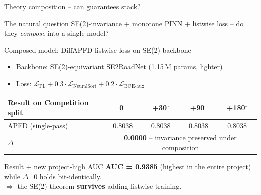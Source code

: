 \documentclass[aspectratio=169,10pt]{beamer}
\begin{document}
\begin{frame}{Theory composition -- can guarantees stack?}
\begin{block}{The natural question}
\footnotesize
SE(2)-invariance + monotone PINN + listwise loss -- do they \emph{compose} into a single model?
\end{block}

\begin{exampleblock}{Composed model: DiffAPFD listwise loss on SE(2) backbone}
\footnotesize
\begin{itemize}
  \item Backbone: SE(2)-equivariant SE2RoadNet (1.15\,M params, lighter)
  \item Loss: $\mathcal{L}_{\text{PL}} + 0.3 \cdot \mathcal{L}_{\text{NeuralSort}} + 0.2 \cdot \mathcal{L}_{\text{BCE-aux}}$
\end{itemize}
\end{exampleblock}

\centering\scriptsize
\begin{tabular}{l c c c c}
  \toprule
  \textbf{Result on Competition split} & \textbf{0$^\circ$} & \textbf{+30$^\circ$} & \textbf{+90$^\circ$} & \textbf{+180$^\circ$} \\
  \midrule
  APFD (single-pass) & 0.8038 & 0.8038 & 0.8038 & 0.8038 \\
  $\Delta$ & \multicolumn{4}{c}{\cellcolor{success!15}\textbf{0.0000} -- invariance preserved under composition} \\
  \bottomrule
\end{tabular}

\vspace{0.7em}
\begin{block}{Result + new project-high AUC}
\footnotesize
\textbf{AUC = 0.9385} (highest in the entire project) while $\Delta$=0 holds bit-identically.\\
$\Rightarrow$ the SE(2) theorem \textbf{survives} adding listwise training.
\end{block}
\end{frame}
\end{document}
